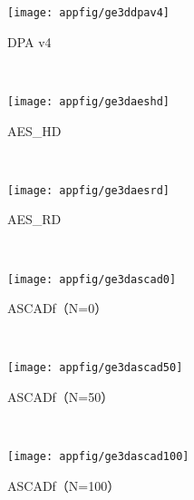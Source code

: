 {	
	\begin{appfig}[!htb]
		\centering
		\begin{subfigure}[b]{\trif\textwidth}
			\texttt{[image: appfig/ge3ddpav4]}
			\caption{DPA v4}
			\label{fig:ge3ddpav4}
		\end{subfigure}%
		~%
		\begin{subfigure}[b]{\trif\textwidth}
			\texttt{[image: appfig/ge3daeshd]}
			\caption{AES\_HD}
			\label{fig:ge3daeshd}
		\end{subfigure}
		~%
		\begin{subfigure}[b]{\trif\textwidth}
			\texttt{[image: appfig/ge3daesrd]}
			\caption{AES\_RD}
			\label{fig:ge3daesrd}
		\end{subfigure}
		\\%
		\begin{subfigure}[b]{\trif\textwidth}
			\texttt{[image: appfig/ge3dascad0]}
			\caption{ASCADf（N=0）}
			\label{fig:ge3dascad0}
		\end{subfigure}%
		~%
		\begin{subfigure}[b]{\trif\textwidth}
			\texttt{[image: appfig/ge3dascad50]}
			\caption{ASCADf（N=50）}
			\label{fig:ge3dascad50}
		\end{subfigure}
		~%
		\begin{subfigure}[b]{\trif\textwidth}
			\texttt{[image: appfig/ge3dascad100]}
			\caption{ASCADf（N=100）}
			\label{fig:ge3dascad100}
		\end{subfigure}
		\\%
		\label{appfig:ge3d}
	\end{appfig}
	
}
